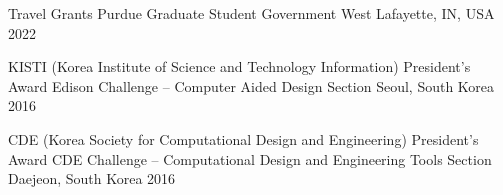 

\begin{cvhonors}

\cvhonor
{Travel Grants} %
{Purdue Graduate Student Government} %
{West Lafayette, IN, USA} %
{2022} %

\cvhonor
{KISTI (Korea Institute of Science and Technology Information) President’s Award} %
{Edison Challenge –  Computer Aided Design Section} %
{Seoul, South Korea} %
{2016} %


\cvhonor
{CDE (Korea Society for Computational Design and Engineering) President’s Award} %
{CDE Challenge – Computational Design and Engineering Tools Section} %
{Daejeon, South Korea} %
{2016} %


\end{cvhonors}
